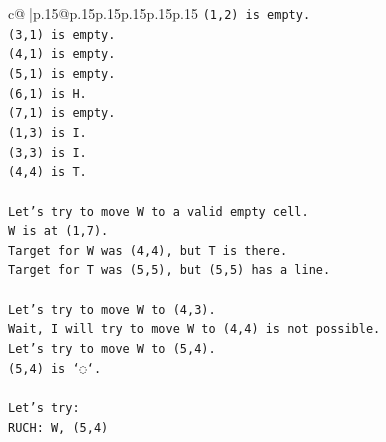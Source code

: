 \documentclass{article}
\begin{document}
{\begin{supertabular}{c@{$\;$}|p{.15\linewidth}@{}p{.15\linewidth}p{.15\linewidth}p{.15\linewidth}p{.15\linewidth}p{.15\linewidth}}
{{{\texttt{(1,2) is empty.} \\
\texttt{(3,1) is empty.} \\
\texttt{(4,1) is empty.} \\
\texttt{(5,1) is empty.} \\
\texttt{(6,1) is H.} \\
\texttt{(7,1) is empty.} \\
\texttt{(1,3) is I.} \\
\texttt{(3,3) is I.} \\
\texttt{(4,4) is T.} \\
\\ 
\texttt{Let's try to move W to a valid empty cell.} \\
\texttt{W is at (1,7).} \\
\texttt{Target for W was (4,4), but T is there.} \\
\texttt{Target for T was (5,5), but (5,5) has a line.} \\
\\ 
\texttt{Let's try to move W to (4,3).} \\
\texttt{Wait, I will try to move W to (4,4) is not possible.} \\
\texttt{Let's try to move W to (5,4).} \\
\texttt{(5,4) is `◌`.} \\
\\ 
\texttt{Let's try:} \\
\texttt{RUCH: W, (5,4)} \\
            }
        }
    }
     \\ \\


\end{supertabular}}
\end{document}
